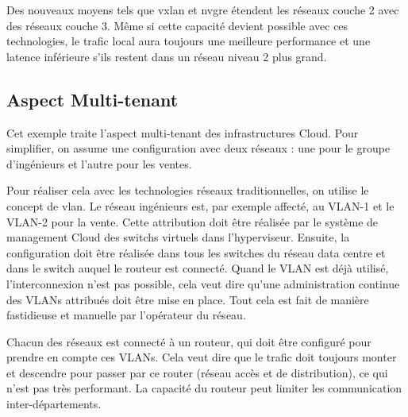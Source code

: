 
Des nouveaux moyens tels que  \gls{vxlan} et \gls{nvgre} étendent les réseaux couche 2 avec des réseaux couche 3. Même si cette capacité devient possible avec ces technologies, le trafic local aura toujours une meilleure performance et une latence inférieure s'ils restent dans un réseau niveau 2 plus grand.



\subsection{Aspect Multi-tenant}

Cet exemple traite l'aspect multi-tenant des infrastructures Cloud. Pour simplifier, on assume une configuration avec deux réseaux : une pour le groupe d'ingénieurs et l'autre pour les ventes. 

Pour réaliser cela avec les technologies réseaux traditionnelles, on utilise le concept de \gls{vlan}. Le réseau ingénieurs est, par exemple affecté, au VLAN-1 et le VLAN-2 pour la vente. Cette attribution doit être réalisée par le système de management Cloud des switchs virtuels dans l'hyperviseur. Ensuite, la configuration doit être réalisée dans tous les switches du réseau data centre et dans le switch auquel le routeur est connecté. Quand le VLAN est déjà utilisé, l'interconnexion n'est pas possible, cela veut dire qu'une administration continue des VLANs attribués doit être mise en place. Tout cela est fait de manière fastidieuse et manuelle par l'opérateur du réseau.

Chacun des réseaux est connecté à un routeur, qui doit être configuré pour prendre en compte ces VLANs. Cela veut dire que le trafic doit toujours monter et descendre pour passer par ce router (réseau accès et de distribution), ce qui n'est pas très performant. La capacité du routeur peut limiter les communication inter-départements. 

